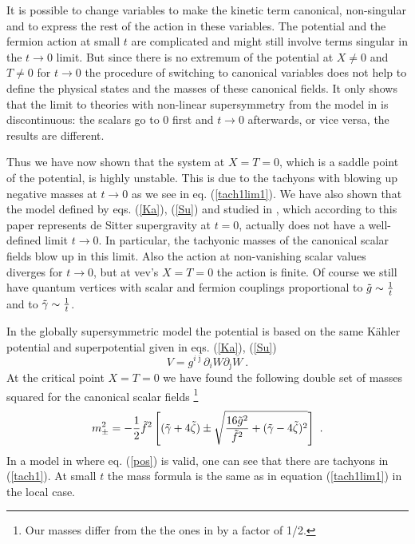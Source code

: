 \documentclass[11pt]{article}
\newcommand{\be}{\begin{equation}}
\newcommand{\ee}{\end{equation}}
\def\K{K{\"a}hler }
\newcommand{\rf}[1]{(\ref{#1})}
\def\be{\begin{equation}}
\def\ee{\end{equation}}
\newcommand{\ls}{\left[}
\newcommand{\rs}{\right]}
\begin{document}
It is possible to change variables to make the kinetic term canonical, non-singular and to express the rest of the action in these variables. The potential and the fermion action at small $t$ are complicated and might still involve terms singular in the $t\to 0$ limit. 
But since there is no extremum of the potential at $X\neq 0$ and $T\neq 0 $ for $t\to 0$ the procedure of switching to canonical variables does not help to define the physical states and the masses of these canonical fields. It only shows that the limit to theories with non-linear supersymmetry from the model in \cite{DallAgata:2022abm} is discontinuous: the scalars go to 0 first and $t\to 0$ afterwards, or vice versa, the results are different.



Thus we have now shown that the system at $X=T=0$, which is a saddle point of the potential, is highly unstable. This is due to the tachyons with blowing up negative masses at $t\to 0$ as we see in eq. \rf{tach1lim1}.
We have also shown that the model defined by eqs. \rf{Ka}, \rf{Su} and studied in \cite{DallAgata:2022abm}, which according to this paper represents de Sitter supergravity at $t=0$, actually does not have a well-defined limit $t \to 0$. In particular, the tachyonic masses of the canonical scalar fields blow up in this limit. Also the action at non-vanishing scalar values diverges for $t\to 0$, but at vev's $X=T=0$ the action is finite. Of course we still have quantum vertices with scalar and fermion couplings proportional to $\tilde g \sim {1\over t}$ and to $\tilde \gamma \sim {1\over t}$.



 
 
In the globally supersymmetric model the potential is  based on the same \K potential and superpotential given in eqs. \rf{Ka}, \rf{Su}
\be
 V=  g^{i\bar \jmath} \partial_i  W \partial_{\bar \jmath} { \overline W} \ .
 \ee
  At the critical point $ X=T=0$  we have  found the following double set of masses squared for the canonical scalar fields \footnote{Our masses differ from the the ones in \cite{DallAgata:2022abm} by a factor of 1/2.}   
\be
 m^2_{\pm} = - {1\over 2} \tilde f^2 \ls ( \tilde \gamma
 + 4 \tilde \zeta) \pm \sqrt { {16\tilde g^2\over \tilde f^2} + (\tilde \gamma - 4 \tilde \zeta)^2}  \rs \ .
  \label{tach1}\ee
In a model in \cite{DallAgata:2022abm} where  eq. \rf{pos} is valid, one can see that  there are tachyons in \rf{tach1}. At small $t$ the mass formula is the same as in equation \rf{tach1lim1} in the local case.
\end{document}
